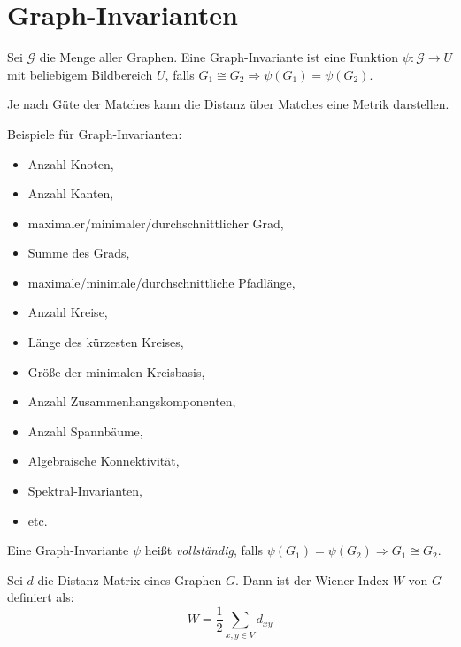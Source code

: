 \chapter{Graph-Invarianten}

\begin{definition}
    Sei $ \mathcal{G} $ die Menge aller Graphen.
    Eine Graph-Invariante ist eine Funktion $ \psi: \mathcal G \rightarrow U $ mit beliebigem Bildbereich $ U $, falls $ G_1 \cong G_2 \Rightarrow \psi(G_1) = \psi(G_2) $.
\end{definition}

\begin{remark}
    Je nach Güte der Matches kann die Distanz über Matches eine Metrik darstellen.
\end{remark}

\begin{example}
    Beispiele für Graph-Invarianten:
    \begin{itemize}
        \item Anzahl Knoten,
        \item Anzahl Kanten,
        \item maximaler/minimaler/durchschnittlicher Grad,
        \item Summe des Grads,
        \item maximale/minimale/durchschnittliche Pfadlänge,
        \item Anzahl Kreise,
        \item Länge des kürzesten Kreises,
        \item Größe der minimalen Kreisbasis,
        \item Anzahl Zusammenhangskomponenten,
        \item Anzahl Spannbäume,
        \item Algebraische Konnektivität,
        \item Spektral-Invarianten,
        \item etc.
    \end{itemize}
\end{example}

\begin{definition}[Vollständig]
    Eine Graph-Invariante $ \psi $ heißt \textit{vollständig}, falls $ \psi(G_1) = \psi(G_2) \Rightarrow G_1 \cong G_2 $.
\end{definition}

\begin{definition}
    Sei $ d $ die Distanz-Matrix eines Graphen $ G $.
    Dann ist der Wiener-Index $ W $ von $ G $ definiert als:
    \begin{equation*}
        W = \frac{1}{2} \sum_{x, y \in V} d_{xy}
    \end{equation*}
\end{definition}

